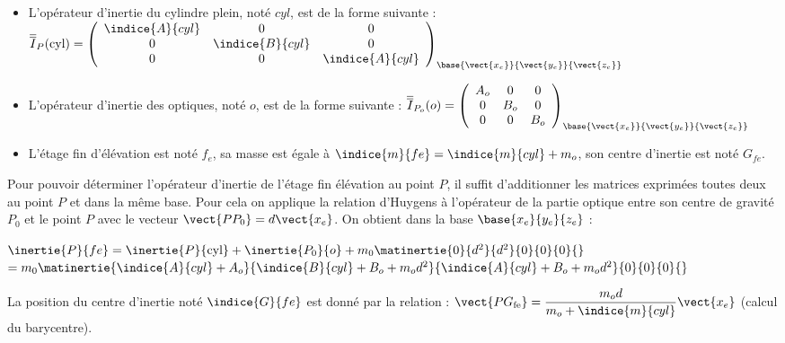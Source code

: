 \begin{itemize}
\item L'opérateur d'inertie du cylindre plein, noté $cyl$, est de la forme suivante :
$
\overline{\overline{I}}_P(\text{cyl})=
\left(
\begin{array}{ccc}
\indice{A}{cyl} & 0 & 0 \\ 
0 & \indice{B}{cyl} & 0 \\ 
0 & 0 & \indice{A}{cyl}
\end{array}
\right)_{\base{\vect{x_e}}{\vect{y_e}}{\vect{z_e}}} 
$
\item L'opérateur d'inertie des optiques, noté $o$, est de la forme suivante :
$
\overline{\overline{I}}_{P_o}(o)=
\left(
\begin{array}{ccc}
A_{o} & 0 & 0 \\ 
0 & B_{o} & 0 \\ 
0 & 0 & B_{o}
\end{array}
\right)_{\base{\vect{x_e}}{\vect{y_e}}{\vect{z_e}}} 
$
\item L'étage fin d'élévation est noté $f_e$, sa masse est égale à $\indice{m}{fe}=\indice{m}{cyl}+m_o$, son centre d'inertie est noté $G_{fe}$.
\end{itemize}

\ifprof
\begin{corrige}
Pour pouvoir déterminer l'opérateur d'inertie de l'étage fin élévation au point $P$, il suffit d'additionner les matrices exprimées toutes deux au point $P$ et dans la même base. Pour cela on applique la relation d'Huygens à l'opérateur de la partie optique entre son centre de gravité $P_0$ et le point $P$  avec le vecteur  $\vect{PP_0}=d\vect{x_e}$. On obtient dans la base  $\base{x_e}{y_e}{z_e}$ :

$
\inertie{P}{fe}=
\inertie{P}{\text{cyl}}+\inertie{P_0}{o}+m_0\matinertie{0}{d^2}{d^2}{0}{0}{0}{}
$
$=m_0\matinertie{\indice{A}{cyl}+A_o}{\indice{B}{cyl}+B_o+m_od^2}{\indice{A}{cyl}+B_o+m_od^2}{0}{0}{0}{}$

La position du centre d'inertie noté $\indice{G}{fe}$ est donné par la relation : $\vect{PG_{\text{fe}}}=\dfrac{m_od}{m_o+\indice{m}{cyl}}\vect{x_e}$ (calcul du barycentre).
\end{corrige}
\else
\fi

